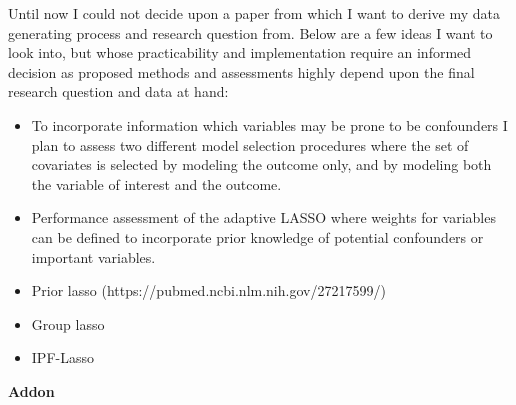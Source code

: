 \documentclass[11pt, a4paper, leqno]{article}
\numberwithin{equation}{section}
\numberwithin{figure}{section}
\numberwithin{table}{section}
\begin{document}
Until now I could not decide upon a paper from which I want to derive my data generating process and research question from. Below are a few ideas I want to look into, but whose practicability and implementation require an informed decision as proposed methods and assessments highly depend upon the final research question and data at hand:

\begin{itemize}
	\item To incorporate information which variables may be prone to be confounders I plan to assess two different model selection procedures where the set of covariates is selected by modeling the outcome only, and by modeling both the variable of interest and the outcome.
	\item Performance assessment of the adaptive LASSO where weights for variables can be defined to incorporate prior knowledge of potential confounders or important variables.
\end{itemize}


\begin{itemize}
	\item Prior lasso (https://pubmed.ncbi.nlm.nih.gov/27217599/)
	\item Group lasso 
	\item IPF-Lasso
\end{itemize}



\textbf{Addon}
\end{document}
